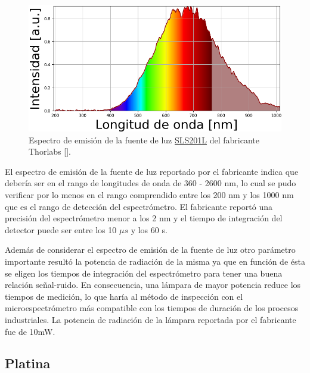 \begin{figure}[H]
	\centering
	\includegraphics[width=1.0\textwidth]{Figs/microespectrometro/espfuentethorl.png}
	\caption{Espectro de emisión de la fuente de luz \href{https://www.thorlabs.com/newgrouppage9.cfm?objectgroup_id=7269&pn=SLS201L/M}{SLS201L} del fabricante Thorlabs [\href{https://github.com/jrr1984/defects_analysis/blob/master/light_sources_spectrum.py}{\faGithub}].}
	\label{fig:espfth}
\end{figure}

El espectro de emisión de la fuente de luz reportado por el fabricante indica que debería ser en el rango de longitudes de onda de 360 - 2600 nm, lo cual se pudo verificar por lo menos en el rango comprendido entre los 200 nm y los 1000 nm que es el rango de detección del espectrómetro. El fabricante reportó una precisión del espectrómetro menor a los 2 nm y el tiempo de integración del detector puede ser entre los 10 $\mu s$ y los 60 s.

Además de considerar el espectro de emisión de la fuente de luz otro parámetro importante resultó la potencia de radiación de la misma ya que en función de ésta se eligen los tiempos de integración del espectrómetro para tener una buena relación señal-ruido. En consecuencia, una lámpara de mayor potencia reduce los tiempos de medición, lo que haría al método de inspección con el microespectrómetro más compatible con los tiempos de duración de los procesos industriales. La potencia de radiación de la lámpara reportada por el fabricante fue de 10mW. 

\singlespacing
\subsection{Platina \href{https://github.com/jrr1984/open\_frame\_XYStage}{\faGithub} \href{https://github.com/jrr1984/open_frame_XYStage/tree/master/3dprintedparts}{\faCubes}}
\label{sec:platina}

